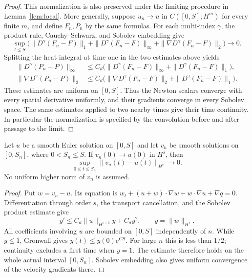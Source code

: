 \begin{proof}
This normalization is also preserved under the limiting procedure in
Lemma~\ref{lem:local}. More generally, suppose
$u_n\to u$ in $C([0,S];H^m)$ for every finite $m$, and define $F_n,P_n$
by the same formulas. For each multi-index $\gamma$, the product rule,
Cauchy--Schwarz, and Sobolev embedding give
\[
 \sup_{t\le S}\bigl(\|D^\gamma(F_n-F)\|_1+
                    \|D^\gamma(F_n-F)\|_\infty+
                    \|\nabla D^\gamma(F_n-F)\|_2\bigr)\longrightarrow0.
\]
Splitting the heat integral at time one in the two estimates above yields
\begin{align*}
 \|D^\gamma(P_n-P)\|_\infty
 &\le C_d\bigl(\|D^\gamma(F_n-F)\|_\infty+
                         \|D^\gamma(F_n-F)\|_1\bigr),\\
 \|\nabla D^\gamma(P_n-P)\|_2
 &\le C_d\bigl(\|\nabla D^\gamma(F_n-F)\|_2+
                         \|D^\gamma(F_n-F)\|_1\bigr).
\end{align*}
These estimates are uniform on $[0,S]$. Thus the Newton scalars converge
with every spatial derivative uniformly, and their gradients converge
in every Sobolev space. The same estimates applied to two nearby times
give their time continuity. In particular the normalization is specified
by the convolution before and after passage to the limit.
\end{proof}

\begin{lemma}\label{lem:stability}
Let $u$ be a smooth Euler solution on $[0,S]$ and let $v_n$ be smooth
solutions on $[0,S_n]$, where $0<S_n\leq S$. If
$v_n(0)\to u(0)$ in $H^s$, then
\[
 \sup_{0\leq t\leq S_n}\|v_n(t)-u(t)\|_{H^s}\longrightarrow0.
\]
No uniform higher norm of $v_n$ is assumed.
\end{lemma}
\begin{proof}
Put $w=v_n-u$. Its equation is
$w_t+(u+w)\cdot\nabla w+w\cdot\nabla u+\nabla q=0$.
Differentiation through order $s$, the transport cancellation, and the
Sobolev product estimate give
\[
 y'\leq C_d\|u\|_{H^{s+1}}y+C_d y^2,
 \qquad y=\|w\|_{H^s}.
\]
All coefficients involving $u$ are bounded on $[0,S]$ independently of
$n$. While $y\leq1$, Gronwall gives $y(t)\leq y(0)e^{CS}$.
For large $n$ this is less than $1/2$; continuity excludes a first time
when $y=1$. The estimate therefore holds on the whole actual interval
$[0,S_n]$. Sobolev embedding also gives uniform convergence of the
velocity gradients there.
\end{proof}

